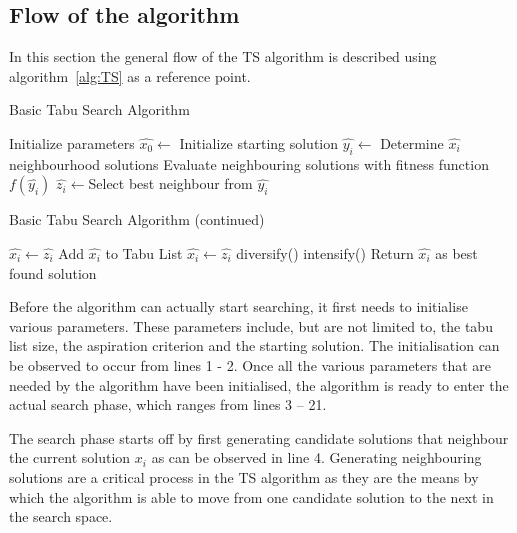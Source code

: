 \subsection{Flow of the algorithm}
In this section the general flow of the \gls{TS} algorithm is described using algorithm~\ref{alg:TS} as a reference point.
\begin{algorithm}[H]
\caption{Basic Tabu Search Algorithm\cite{TabuRCAProblem,TabuMontemanniSmith}}
\label{alg:TS}
	\begin{algorithmic}[1]
		\State Initialize parameters
    \State $\hat{x_0} \leftarrow$ Initialize starting solution
    \State $\hat{y_i} \leftarrow$ Determine $\hat{x_i}$ neighbourhood solutions 
    \State Evaluate neighbouring solutions with fitness function $f(\hat{y_i})$
    \State $\hat{z_i} \leftarrow$Select best neighbour from $\hat{y_i}$
    \end{algorithmic}
\end{algorithm}
\begin{algorithm}[H]
    \caption{Basic Tabu Search Algorithm (continued)\cite{TabuRCAProblem, TabuMontemanniSmith}}
    \begin{algorithmic}
    \State $\hat{x_i} \leftarrow \hat{z_i}$
				\EndIf
			\Else
      \State Add $\hat{x_i}$ to Tabu List
      \State $\hat{x_i} \leftarrow \hat{z_i}$
					\State diversify()
				\Else
					\State intensify()
				\EndIf
			\EndIf
		\EndWhile
    \State Return $\hat{x_i}$ as best found solution
	\end{algorithmic}
\end{algorithm}

Before the algorithm can actually start searching, it first needs to initialise various parameters. These parameters include, but are not limited to, the tabu list size, the aspiration criterion and the starting solution. The initialisation can be observed to occur from lines 1 - 2. Once all the various parameters that are needed by the algorithm have been initialised, the algorithm is ready to enter the actual search phase, which ranges from lines 3 -- 21. 

The search phase starts off by first generating candidate solutions that neighbour the current solution $x_i$ as can be observed in line 4. Generating neighbouring solutions are a critical process in the \gls{TS} algorithm as they are the means by which the algorithm is able to move from one candidate solution to the next in the search space.

